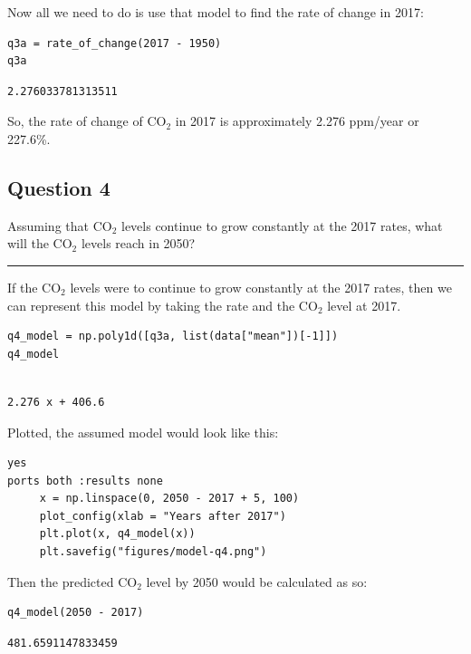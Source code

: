 \documentclass[11pt]{article}
\begin{document}
Now all we need to do is use that model to find the
rate of change in 2017:

\begin{verbatim}
q3a = rate_of_change(2017 - 1950)
q3a
\end{verbatim}

\begin{verbatim}
2.276033781313511
\end{verbatim}

So, the rate of change of CO\(_{\text{2}}\) in 2017 is approximately
2.276 ppm/year or 227.6\%.

\subsection{Question 4}
\label{sec:orge7010f3}

Assuming that CO\(_{\text{2}}\) levels continue to grow constantly at the
2017 rates, what will the CO\(_{\text{2}}\) levels reach in 2050?

\noindent\rule{\textwidth}{0.5pt}

If the CO\(_{\text{2}}\) levels were to continue to grow constantly
at the 2017 rates, then we can represent this model
by taking the rate and the CO\(_{\text{2}}\) level at 2017.

\begin{verbatim}
q4_model = np.poly1d([q3a, list(data["mean"])[-1]])
q4_model
\end{verbatim}

\begin{verbatim}
 
2.276 x + 406.6
\end{verbatim}

Plotted, the assumed model would look like this:

\begin{verbatim}
yes
ports both :results none
     x = np.linspace(0, 2050 - 2017 + 5, 100)
     plot_config(xlab = "Years after 2017")
     plt.plot(x, q4_model(x))
     plt.savefig("figures/model-q4.png")
\end{verbatim}

Then the predicted CO\(_{\text{2}}\) level by 2050 would be calculated as so:

\begin{verbatim}
q4_model(2050 - 2017)
\end{verbatim}

\begin{verbatim}
481.6591147833459
\end{verbatim}
\end{document}

